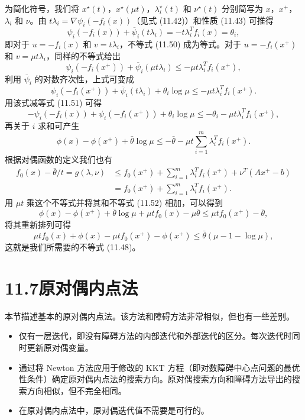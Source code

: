 \documentclass[UTF8, 12pt, fontset=fandol, oneside]{ctexart}
\begin{document}
为简化符号，我们将 $x^\star(t)$，$x^\star(\mu t)$，$\lambda_i^\star(t)$ 和 $\nu^\star(t)$ 分别简写为 $x$，$x^+$，$\lambda_i$ 和 $\nu$。由 $t\lambda_i=\nabla\psi_i(-f_i(x))$（见式 (11.42)）和性质 (11.43) 可推得
\begin{equation}
\psi_i(-f_i(x))+\overline{\psi}_i(t\lambda_i)=-t\lambda_i^Tf_i(x)=\theta_i,
\tag{11.51}
\end{equation}
即对于 $u=-f_i(x)$ 和 $v=t\lambda_i$，不等式 (11.50) 成为等式。对于 $u=-f_i(x^+)$ 和 $v=\mu t\lambda_i$，同样的不等式给出
\[
\psi_i(-f_i(x^+))+\overline{\psi}_i(\mu t\lambda_i)\leq -\mu t\lambda_i^Tf_i(x^+),
\]
利用 $\overline{\psi}_i$ 的对数齐次性，上式可变成
\[
\psi_i(-f_i(x^+))+\overline{\psi}_i(t\lambda_i)+\theta_i\log\mu\leq -\mu t\lambda_i^Tf_i(x^+).
\]
用该式减等式 (11.51) 可得
\[
-\psi_i(-f_i(x))+\psi_i(-f_i(x^+))+\theta_i\log\mu\leq -\theta_i-\mu t\lambda_i^Tf_i(x^+),
\]
再关于 $i$ 求和可产生
\begin{equation}
\phi(x)-\phi(x^+)+\bar{\theta}\log\mu\leq -\bar{\theta}-\mu t\sum_{i=1}^m\lambda_i^Tf_i(x^+).
\tag{11.52}
\end{equation}
根据对偶函数的定义我们也有
\[
\begin{aligned}
f_0(x)-\bar{\theta}/t=g(\lambda,\nu)
&\leq f_0(x^+)+\sum_{i=1}^m\lambda_i^Tf_i(x^+)+\nu^T(Ax^+-b)\\
&=f_0(x^+)+\sum_{i=1}^m\lambda_i^Tf_i(x^+).
\end{aligned}
\]
用 $\mu t$ 乘这个不等式并将其和不等式 (11.52) 相加，可以得到
\[
\phi(x)-\phi(x^+)+\bar{\theta}\log\mu+\mu tf_0(x)-\mu\bar{\theta}\leq \mu tf_0(x^+)-\bar{\theta},
\]
将其重新排列可得
\[
\mu tf_0(x)+\phi(x)-\mu tf_0(x^+)-\phi(x^+)\leq \bar{\theta}(\mu-1-\log\mu),
\]
这就是我们所需要的不等式 (11.48)。

\section*{11.7\quad 原对偶内点法}

本节描述基本的原对偶内点法。该方法和障碍方法非常相似，但也有一些差别。
\begin{itemize}
\item 仅有一层迭代，即没有障碍方法的内部迭代和外部迭代的区分。每次迭代时同时更新原对偶变量。
\item 通过将 Newton 方法应用于修改的 KKT 方程（即对数障碍中心点问题的最优性条件）确定原对偶内点法的搜索方向。原对偶搜索方向和障碍方法导出的搜索方向相似，但不完全相同。
\item 在原对偶内点法中，原对偶迭代值不需要是可行的。
\end{itemize}
\end{document}
